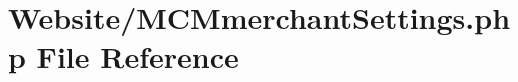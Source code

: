 \hypertarget{_m_c_mmerchant_settings_8php}{\section{Website/\-M\-C\-Mmerchant\-Settings.php File Reference}
\label{_m_c_mmerchant_settings_8php}
}

